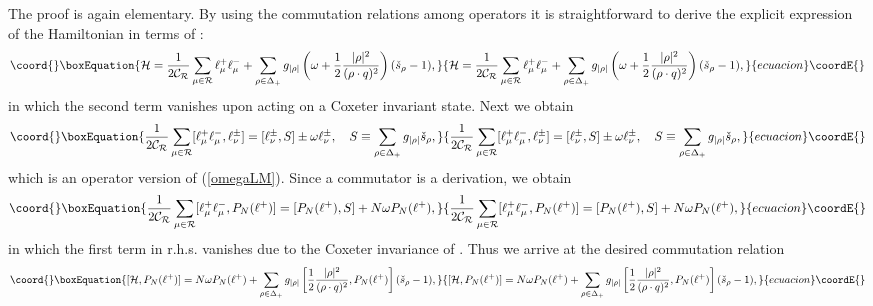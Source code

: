 \documentclass[a4paper,12pt]{article}
\begin{document}
The proof is again elementary.
By using the commutation relations among
\myHighlight{\(\ell^\pm\)}\coordHE{} operators it is straightforward to derive the explicit
expression of the Hamiltonian  in terms of \myHighlight{\(\ell^\pm\)}\coordHE{}:
\begin{equation}\coord{}\boxEquation{
   {\cal
   H}=\frac{1}{2\mathcal{C_R}}
   \sum_{\mu\in\mathcal{R}}\ell^+_{\mu}\ell^-_{\mu}
   +
   \sum_{\rho\in\Delta_{+}}g_{|\rho|}\left(\omega
   +\frac{1}{2}{|\rho|^2\over{(\rho\cdot q)^2}}\right)(\check{s}_{\rho}-1),
   \label{llham}
}{
   {\cal
   H}=\frac{1}{2\mathcal{C_R}}
   \sum_{\mu\in\mathcal{R}}\ell^+_{\mu}\ell^-_{\mu}
   +
   \sum_{\rho\in\Delta_{+}}g_{|\rho|}\left(\omega
   +\frac{1}{2}{|\rho|^2\over{(\rho\cdot q)^2}}\right)(\check{s}_{\rho}-1),
   }{ecuacion}\coordE{}\end{equation}
in which the second term vanishes upon acting on a
Coxeter invariant state.
Next we obtain
\begin{equation}\coord{}\boxEquation{
   \frac{1}{2\mathcal{C_R}}
   \sum_{\mu\in\mathcal{R}}[\ell^+_{\mu}\ell^-_{\mu},
   \ell_\nu^\pm]=[\ell_\nu^\pm,S]\pm\omega\ell_\nu^\pm,\quad
   S\equiv\sum_{\rho\in\Delta_+}g_{|\rho|}\check{s}_{\rho},
}{
   \frac{1}{2\mathcal{C_R}}
   \sum_{\mu\in\mathcal{R}}[\ell^+_{\mu}\ell^-_{\mu},
   \ell_\nu^\pm]=[\ell_\nu^\pm,S]\pm\omega\ell_\nu^\pm,\quad
   S\equiv\sum_{\rho\in\Delta_+}g_{|\rho|}\check{s}_{\rho},
}{ecuacion}\coordE{}\end{equation}
which is an \myHighlight{\(\ell\)}\coordHE{} operator version of (\ref{omegaLM}).
Since a commutator is a derivation, we obtain
\begin{equation}\coord{}\boxEquation{
   \frac{1}{2\mathcal{C_R}}
   \sum_{\mu\in\mathcal{R}}[\ell^+_{\mu}\ell^-_{\mu},
   P_N(\ell^+)]=[P_N(\ell^+),S]+N\omega P_N(\ell^+),
}{
   \frac{1}{2\mathcal{C_R}}
   \sum_{\mu\in\mathcal{R}}[\ell^+_{\mu}\ell^-_{\mu},
   P_N(\ell^+)]=[P_N(\ell^+),S]+N\omega P_N(\ell^+),
}{ecuacion}\coordE{}\end{equation}
in which the first term in r.h.s. vanishes due to the Coxeter invariance
of \coordHE{}. Thus we arrive at the desired commutation relation
\begin{equation}\coord{}\boxEquation{
   [{\cal H}, P_N(\ell^+)]=N\omega P_N(\ell^+)+
   \sum_{\rho\in\Delta_{+}}g_{|\rho|}\left[
   \frac{1}{2}{|\rho|^2\over{(\rho\cdot
   q)^2}},P_N(\ell^+)\right](\check{s}_{\rho}-1),
}{
   [{\cal H}, P_N(\ell^+)]=N\omega P_N(\ell^+)+
   \sum_{\rho\in\Delta_{+}}g_{|\rho|}\left[
   \frac{1}{2}{|\rho|^2\over{(\rho\cdot
   q)^2}},P_N(\ell^+)\right](\check{s}_{\rho}-1),
}{ecuacion}\coordE{}\end{equation}
\end{document}
